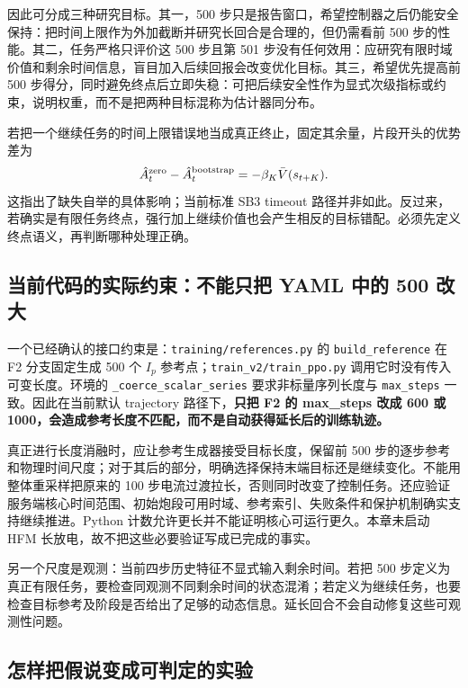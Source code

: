 \documentclass[12pt,fontset=none]{ctexart}
\numberwithin{equation}{section}
\numberwithin{table}{section}
\numberwithin{figure}{section}
\begin{document}
因此可分成三种研究目标。其一，500 步只是报告窗口，希望控制器之后仍能安全保持：把时间上限作为外加截断并研究长回合是合理的，但仍需看前 500 步的性能。其二，任务严格只评价这 500 步且第 501 步没有任何效用：应研究有限时域价值和剩余时间信息，盲目加入后续回报会改变优化目标。其三，希望优先提高前 500 步得分，同时避免终点后立即失稳：可把后续安全性作为显式次级指标或约束，说明权重，而不是把两种目标混称为估计器同分布。

若把一个继续任务的时间上限错误地当成真正终止，固定其余量，片段开头的优势差为
\begin{equation}\label{eq:gaet-wrongzero}
 \hat A_t^{\rm zero}-\hat A_t^{\rm bootstrap}
 =-\beta_K\bar V(s_{t+K}).
\end{equation}
这指出了缺失自举的具体影响；当前标准 SB3 timeout 路径并非如此。反过来，若确实是有限任务终点，强行加上继续价值也会产生相反的目标错配。必须先定义终点语义，再判断哪种处理正确。

\subsection{当前代码的实际约束：不能只把 YAML 中的 500 改大}

一个已经确认的接口约束是：\texttt{training/references.py} 的 \texttt{build\_reference} 在 F2 分支固定生成 500 个 $I_p$ 参考点；\texttt{train\_v2/train\_ppo.py} 调用它时没有传入可变长度。环境的 \texttt{\_coerce\_scalar\_series} 要求非标量序列长度与 \texttt{max\_steps} 一致。因此在当前默认 trajectory 路径下，\textbf{只把 F2 的 max\_steps 改成 600 或 1000，会造成参考长度不匹配，而不是自动获得延长后的训练轨迹。}

真正进行长度消融时，应让参考生成器接受目标长度，保留前 500 步的逐步参考和物理时间尺度；对于其后的部分，明确选择保持末端目标还是继续变化。不能用整体重采样把原来的 100 步电流过渡拉长，否则同时改变了控制任务。还应验证服务端核心时间范围、初始炮段可用时域、参考索引、失败条件和保护机制确实支持继续推进。Python 计数允许更长并不能证明核心可运行更久。本章未启动 HFM 长放电，故不把这些必要验证写成已完成的事实。

另一个尺度是观测：当前四步历史特征不显式输入剩余时间。若把 500 步定义为真正有限任务，要检查同观测不同剩余时间的状态混淆；若定义为继续任务，也要检查目标参考及阶段是否给出了足够的动态信息。延长回合不会自动修复这些可观测性问题。

\subsection{怎样把假说变成可判定的实验}
\end{document}
